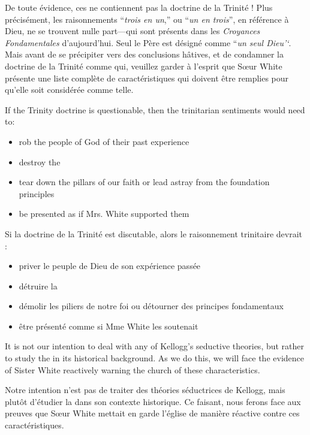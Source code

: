 De toute évidence, ces  ne contiennent pas la doctrine de la Trinité ! Plus précisément, les raisonnements “\textit{trois en un},” ou “\textit{un en trois}”, en référence à Dieu, ne se trouvent nulle part—qui sont présents dans les \textit{Croyances Fondamentales} d'aujourd'hui. Seul le Père est désigné comme “\textit{un seul Dieu’‘}. Mais avant de se précipiter vers des conclusions hâtives, et de condamner la doctrine de la Trinité comme qui, veuillez garder à l'esprit que Sœur White présente une liste complète de caractéristiques qui doivent être remplies pour qu'elle soit considérée comme telle.


If the Trinity doctrine is questionable, then the trinitarian sentiments would need to:
\begin{itemize}
    \item rob the people of God of their past experience
    \item destroy the 
    \item tear down the pillars of our faith or lead astray from the foundation principles
    \item be presented as if Mrs. White supported them
\end{itemize}


Si la doctrine de la Trinité est discutable, alors le raisonnement trinitaire devrait :
\begin{itemize}
    \item priver le peuple de Dieu de son expérience passée
    \item détruire la 
    \item démolir les piliers de notre foi ou détourner des principes fondamentaux
    \item être présenté comme si Mme White les soutenait
\end{itemize}


It is not our intention to deal with any of Kellogg’s seductive theories, but rather to study the  in its historical background. As we do this, we will face the evidence of Sister White reactively warning the church of these characteristics.


Notre intention n'est pas de traiter des théories séductrices de Kellogg, mais plutôt d'étudier la  dans son contexte historique. Ce faisant, nous ferons face aux preuves que Sœur White mettait en garde l'église de manière réactive contre ces caractéristiques.


